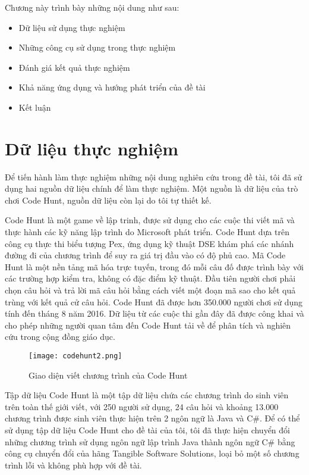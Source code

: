 Chương này trình bày những nội dung như sau:
\begin{itemize}
	\item Dữ liệu sử dụng thực nghiệm
	\item Những công cụ sử dụng trong thực nghiệm
	\item Đánh giá kết quả thực nghiệm
	\item Khả năng ứng dụng và hướng phát triển của đề tài
	\item Kết luận
\end{itemize}



\section{Dữ liệu thực nghiệm}
Để tiến hành làm thực nghiệm những nội dung nghiên cứu trong đề tài, tôi đã sử dụng hai nguồn dữ liệu chính để làm thực nghiệm. Một nguồn là dữ liệu của trò chơi Code Hunt, nguồn dữ liệu còn lại do tôi tự thiết kế.

Code Hunt \cite{CodeHunt} là một game về lập trinh, được sử dụng cho các cuộc thi viết mã và thực hành các kỹ năng lập trình do Microsoft phát triển. Code Hunt dựa trên công cụ thực thi biểu tượng Pex, ứng dụng kỹ thuật DSE khám phá các nhánh đường đi của chương trình để suy ra giá trị đầu vào có độ phủ cao. Mã Code Hunt là một nền tảng mã hóa trực tuyến, trong đó mỗi câu đố được trình bày với các trường hợp kiểm tra, không có đặc điểm kỹ thuật. Đầu tiên người chơi phải chọn câu hỏi và trả lời mã câu hỏi bằng cách viết một đoạn mã sao cho kết quả trùng với kết quả cử câu hỏi. Code Hunt đã được hơn 350.000 người chơi sử dụng tính đến tháng 8 năm 2016. Dữ liệu từ các cuộc thi gần đây đã được công khai và cho phép những người quan tâm đến Code Hunt tải về để phân tích và nghiên cứu trong cộng đồng giáo dục.

\label{sec:data}
\begin{center}
	\begin{figure}[htp]
		\begin{center}
			\texttt{[image: codehunt2.png]}
		\end{center}
		\caption{Giao diện viết chương trình của Code Hunt}
		\label{refhinh1}
	\end{figure}
\end{center}


Tập dữ liệu Code Hunt là một tập dữ liệu chứa các chương trình do sinh viên trên toàn thế giới viết, với 250 người sử dụng, 24 câu hỏi và khoảng 13.000 chương trình được sinh viên thực hiện trên 2 ngôn ngữ là Java và C\#. Để có thể sử dụng tập dữ liệu Code Hunt cho đề tài của tôi, tôi đã thực hiện chuyển đổi những chương trình sử dụng ngôn ngữ lập trình Java thành ngôn ngữ C\# bằng công cụ chuyển đổi của hãng Tangible Software Solutions, loại bỏ một số chương trình lỗi và không phù hợp với đề tài.


